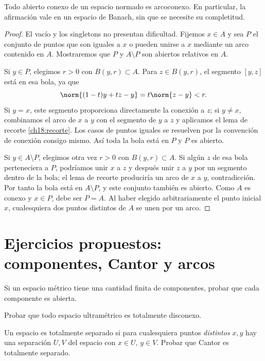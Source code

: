 \begin{teorema}\label{ch18:abiertoconexo}
Todo abierto conexo de un espacio normado es arcoconexo. En particular, la afirmación vale en un espacio de Banach, sin que se necesite su completitud.
\end{teorema}
\begin{proof}
El vacío y los singletons no presentan dificultad. Fijemos $x\in A$ y sea $P$ el conjunto de puntos que son iguales a $x$ o pueden unirse a $x$ mediante un arco contenido en $A$. Mostraremos que $P$ y $A\setminus P$ son abiertos relativos en $A$.

Si $y\in P$, elegimos $r>0$ con $B(y,r)\subset A$. Para $z\in B(y,r)$, el segmento $[y,z]$ está en esa bola, ya que
\[
\norm{(1-t)y+tz-y}=t\norm{z-y}<r.
\]
Si $y=x$, este segmento proporciona directamente la conexión a $z$; si $y\ne x$, combinamos el arco de $x$ a $y$ con el segmento de $y$ a $z$ y aplicamos el lema de recorte \ref{ch18:recorte}. Los casos de puntos iguales se resuelven por la convención de conexión consigo mismo. Así toda la bola está en $P$ y $P$ es abierto.

Si $y\in A\setminus P$, elegimos otra vez $r>0$ con $B(y,r)\subset A$. Si algún $z$ de esa bola perteneciera a $P$, podríamos unir $x$ a $z$ y después unir $z$ a $y$ por un segmento dentro de la bola; el lema de recorte produciría un arco de $x$ a $y$, contradicción. Por tanto la bola está en $A\setminus P$, y este conjunto también es abierto. Como $A$ es conexo y $x\in P$, debe ser $P=A$. Al haber elegido arbitrariamente el punto inicial $x$, cualesquiera dos puntos distintos de $A$ se unen por un arco.
\end{proof}

\section{Ejercicios propuestos: componentes, Cantor y arcos}
\begin{ejercicio}\label{ej:lectura-18-1}
Si un espacio métrico tiene una cantidad finita de componentes, probar que cada componente es abierta.
\end{ejercicio}


\begin{ejercicio}\label{ej:lectura-18-2}
Probar que todo espacio ultramétrico es totalmente disconexo.
\end{ejercicio}


\begin{ejercicio}\label{ej:lectura-18-3}
Un espacio es totalmente separado si para cualesquiera puntos \emph{distintos} $x,y$ hay una separación $U,V$ del espacio con $x\in U$, $y\in V$. Probar que Cantor es totalmente separado.
\end{ejercicio}


